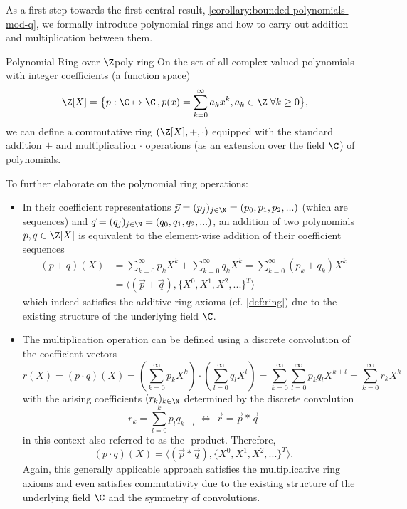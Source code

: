 As a first step towards the first central result, \autoref{corollary:bounded-polynomials-mod-q}, we formally introduce polynomial rings and how to carry out addition and multiplication between them.

\begin{definition}{Polynomial Ring over $\Z$}{poly-ring}
  On the set of all complex-valued polynomials with integer coefficients (a function space)
  $$\Z[X] = \big\{p: \C \mapsto \C \,, p(x) = \sum_{k=0}^\infty a_k x^k, a_k \in \Z \;\forall k \geq 0\big\},$$
  we can define a commutative ring $(\Z[X], +, \cdot)$ equipped with the standard addition $+$ and multiplication $\cdot$ operations (as an extension over the field $\C$) of polynomials.
\end{definition}

To further elaborate on the polynomial ring operations:
\begin{itemize}
  \item In their coefficient representations $\vec{p} = (p_j)_{j\in\N} = (p_0, p_1, p_2, ...)$ (which are sequences) and $\vec{q} = (q_j)_{j\in\N} = (q_0, q_1, q_2, ...)$, an addition of two polynomials $p, q \in \Z[X]$ is equivalent to the element-wise addition of their coefficient sequences
        \begin{align*}
          (p + q)(X) & = \sum_{k=0}^\infty p_k X^k + \sum_{k=0}^\infty q_k X^k = \sum_{k=0}^\infty (p_k + q_k) X^k \\
                     & = \langle (\vec{p} + \vec{q}), \{X^0, X^1, X^2, ...\}^T \rangle
        \end{align*}
        which indeed satisfies the additive ring axioms (cf. \autoref{def:ring}) due to the existing structure of the underlying field $\C$.
  \item The multiplication operation can be defined using a discrete convolution of the coefficient vectors
        $$r(X) = (p \cdot q)(X) = (\sum_{k=0}^\infty p_k X^k) \cdot (\sum_{l=0}^\infty q_l X^l)
          = \sum_{k=0}^\infty \sum_{l=0}^\infty p_k q_l X^{k+l}
          = \sum_{k=0}^\infty r_k X^k$$
        with the arising coefficients $(r_k)_{k\in\N}$ determined by the discrete convolution
        $$r_k = \sum_{l=0}^k p_l q_{k-l} \;\Leftrightarrow\; \vec{r} = \vec{p} * \vec{q}$$
        in this context also referred to as the -product. Therefore,
        $$(p \cdot q)(X) = \langle (\vec{p} * \vec{q}), \{X^0, X^1, X^2, ...\}^T \rangle.$$
        Again, this generally applicable approach satisfies the multiplicative ring axioms and even satisfies commutativity due to the existing structure of the underlying field $\C$ and the symmetry of convolutions.
\end{itemize}

